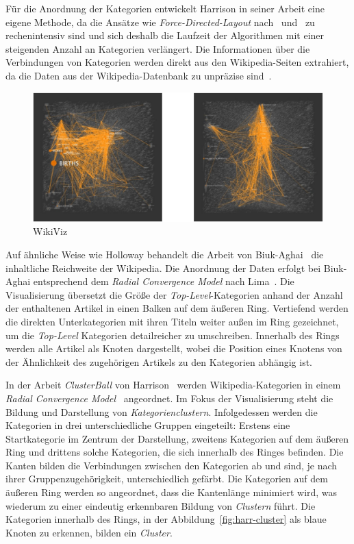 Für die Anordnung der Kategorien entwickelt Harrison in seiner Arbeit eine eigene Methode, da die Ansätze wie \emph{Force-Directed-Layout} nach~\cite{fruchterman1991graph} und~\cite{kamada1989algorithm} zu rechenintensiv sind und sich deshalb die Laufzeit der Algorithmen mit einer steigenden Anzahl an Kategorien verlängert.
Die Informationen über die Verbindungen von Kategorien werden direkt aus den Wikipedia-Seiten extrahiert, da die Daten aus der Wikipedia-Datenbank zu unpräzise sind~\cite{harrison2006wikiviz}.
\begin{figure}[H]
    \centering
    \includegraphics[width=\textwidth]{images/har-wikiviz}
    \caption{WikiViz \cite{harrison2006wikiviz}}
    \label{fig:harr-wikiviz}
\end{figure}
Auf ähnliche Weise wie Holloway behandelt die Arbeit von Biuk-Aghai~\cite{biuk2011wikipedia} die inhaltliche Reichweite der Wikipedia.
Die Anordnung der Daten erfolgt bei Biuk-Aghai entsprechend dem \emph{Radial Convergence Model} nach Lima~\cite[S.~63]{lima2017circle}.
Die Visualisierung übersetzt die Größe der \emph{Top-Level}-Kategorien anhand der Anzahl der enthaltenen Artikel in einen Balken auf dem äußeren Ring. Vertiefend werden die direkten Unterkategorien mit ihren Titeln weiter außen im Ring gezeichnet, um die \emph{Top-Level} Kategorien detailreicher zu umschreiben.
Innerhalb des Rings werden alle Artikel als Knoten dargestellt, wobei die Position eines Knotens von der Ähnlichkeit des zugehörigen Artikels zu den Kategorien abhängig ist.


In der Arbeit \emph{ClusterBall} von Harrison~\cite{harrison2006clusterbal} werden Wikipedia-Kategorien in einem \emph{Radial Convergence Model}~ \cite[S.~63]{lima2017circle} angeordnet.
Im Fokus der Visualisierung steht die Bildung und Darstellung von \emph{Kategorienclustern}.
Infolgedessen werden die Kategorien in drei unterschiedliche Gruppen eingeteilt: Erstens eine Startkategorie im Zentrum der Darstellung, zweitens Kategorien auf dem äußeren Ring und drittens solche Kategorien, die sich innerhalb des Ringes befinden.
Die Kanten bilden die Verbindungen zwischen den Kategorien ab und sind, je nach ihrer Gruppenzugehörigkeit, unterschiedlich gefärbt.
Die Kategorien auf dem äußeren Ring werden so angeordnet, dass die Kantenlänge minimiert wird, was wiederum zu einer eindeutig erkennbaren Bildung von \emph{Clustern} führt.
Die Kategorien innerhalb des Rings, in der Abbildung~\ref{fig:harr-cluster} als blaue Knoten zu erkennen, bilden ein \emph{Cluster}. 

